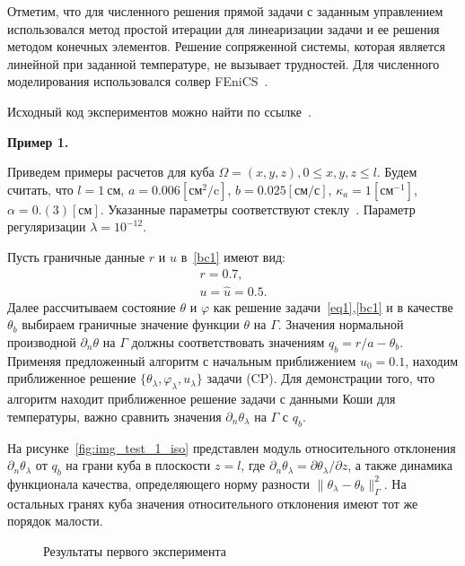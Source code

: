 Отметим, что для численного решения прямой задачи с заданным управлением использовался
метод простой итерации для линеаризации задачи и ее решения методом конечных элементов.
Решение сопряженной системы, которая является линейной при заданной температуре, не вызывает трудностей.
Для численного моделирования использовался солвер FEniCS~\cite{fenics, dolfin}.

Исходный код экспериментов можно найти по ссылке~\cite{mesenev-github}.

\textbf{Пример 1.}

Приведем примеры расчетов для куба $\Omega = {(x, y, z), 0 \leq x,y,z \leq l}$.
Будем считать, что $l=1~\text{см}$, $a = 0.006[\text{см}^2/\text{c}]$,
$b=0.025[\text{см}/\text{с}]$, $\kappa_a=1[\text{см}^{-1}]$, $\alpha = 0.(3)[\text{см}]$.
Указанные параметры соответствуют стеклу~\cite{Grenkin5}.
Параметр регуляризации $\lambda=10^{-12}.$

Пусть граничные данные $r$ и $u$ в~\eqref{bc1} имеют вид:
\begin{gather*}
    r = 0.7,\\
    u = \hat u = 0.5.
\end{gather*}
Далее рассчитываем состояние $\theta$ и $\varphi$ как решение
задачи~\eqref{eq1},\eqref{bc1} и в качестве $\theta_b$ выбираем
граничные значение функции $\theta$ на $\Gamma$.
Значения нормальной производной $\partial_n\theta$ на $\Gamma$
должны соответствовать значениям $q_b=r/a-\theta_b$.
Применяя предложенный алгоритм с начальным приближением $u_0 = 0.1$, находим приближенное решение
$\{\theta_\lambda, \varphi_\lambda, u_\lambda\}$ задачи (CP).
Для демонстрации того, что алгоритм находит приближенное решение задачи с данными
Коши для температуры, важно сравнить значения $\partial_n\theta_\lambda$ на $\Gamma$ с $q_b.$

На рисунке~\ref{fig:img_test_1_iso} представлен модуль относительного
отклонения $\partial_n\theta_\lambda$ от $q_b$ на грани куба в плоскости $z=l$,
где $\partial_n\theta_\lambda=\partial\theta_\lambda/\partial z$,
а также динамика функционала качества, определяющего норму
разности $\|\theta_\lambda -\theta_b\|^2_\Gamma$.
На остальных гранях куба значения относительного отклонения имеют тот же порядок малости.

\begin{figure}
    \centering
    \caption{Результаты первого эксперимента}
\end{figure}

